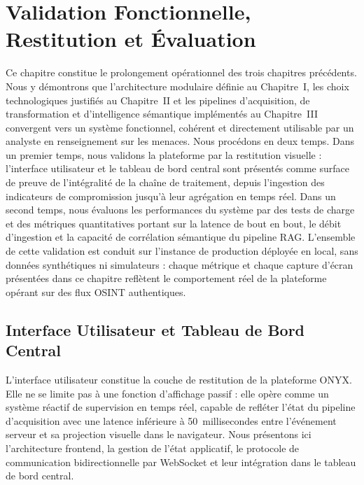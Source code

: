 \chapter{Validation Fonctionnelle, Restitution et Évaluation}

Ce chapitre constitue le prolongement opérationnel des trois chapitres précédents. Nous y démontrons que l'architecture modulaire définie au Chapitre~I, les choix technologiques justifiés au Chapitre~II et les pipelines d'acquisition, de transformation et d'intelligence sémantique implémentés au Chapitre~III convergent vers un système fonctionnel, cohérent et directement utilisable par un analyste en renseignement sur les menaces. Nous procédons en deux temps. Dans un premier temps, nous validons la plateforme par la restitution visuelle : l'interface utilisateur et le tableau de bord central sont présentés comme surface de preuve de l'intégralité de la chaîne de traitement, depuis l'ingestion des indicateurs de compromission jusqu'à leur agrégation en temps réel. Dans un second temps, nous évaluons les performances du système par des tests de charge et des métriques quantitatives portant sur la latence de bout en bout, le débit d'ingestion et la capacité de corrélation sémantique du pipeline RAG. L'ensemble de cette validation est conduit sur l'instance de production déployée en local, sans données synthétiques ni simulateurs : chaque métrique et chaque capture d'écran présentées dans ce chapitre reflètent le comportement réel de la plateforme opérant sur des flux OSINT authentiques.

\section{Interface Utilisateur et Tableau de Bord Central}

L'interface utilisateur constitue la couche de restitution de la plateforme ONYX. Elle ne se limite pas à une fonction d'affichage passif : elle opère comme un système réactif de supervision en temps réel, capable de refléter l'état du pipeline d'acquisition avec une latence inférieure à 50~millisecondes entre l'événement serveur et sa projection visuelle dans le navigateur. Nous présentons ici l'architecture frontend, la gestion de l'état applicatif, le protocole de communication bidirectionnelle par WebSocket et leur intégration dans le tableau de bord central.

